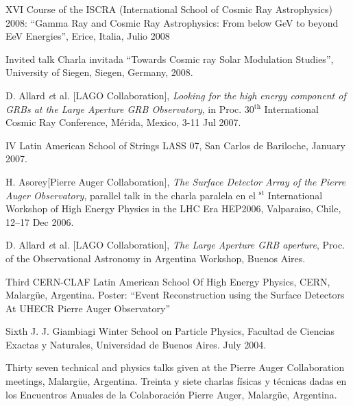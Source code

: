 \begin{etaremune}
\item {}XVI Course of the ISCRA (International School of Cosmic Ray Astrophysics) 2008: ``Gamma Ray and Cosmic Ray Astrophysics: From below GeV to beyond EeV Energies'', Erice, Italia, Julio 2008

\item {}\ifeng Invited talk \else Charla invitada \fi ``Towards Cosmic ray Solar Modulation Studies'', University of Siegen, Siegen, Germany, 2008.

\item {}D. Allard {\emph et al.} [LAGO Collaboration], {\emph{Looking for the high energy component of GRBs at the Large Aperture GRB Observatory}}, in Proc. 30$^{\mathrm{th}}$ International Cosmic Ray Conference,  Mérida, Mexico, 3-11 Jul 2007.

\item {}IV Latin American School of Strings LASS 07, San Carlos de Bariloche, January 2007.

\item {}H. Asorey[Pierre Auger Collaboration], {\emph{The Surface Detector Array of the Pierre Auger Observatory}}, 
\ifeng
parallel talk in the 
\else
charla paralela en el 
$^{\mathrm{st}}$ International Workshop of High Energy Physics in the LHC Era HEP2006, Valparaiso, Chile, 12--17 Dec 2006.

\item {}D. Allard {\emph et al.} [LAGO Collaboration], {\emph{The Large Aperture GRB aperture}}, \en Proc. of the Observational Astronomy in Argentina Workshop, Buenos Aires.

\item {}Third CERN-CLAF Latin American School Of High Energy Physics, CERN, Malargüe, Argentina. Poster: ``Event Reconstruction using the Surface Detectors At UHECR Pierre Auger Observatory''

\item {}Sixth J. J. Giambiagi Winter School on Particle Physics, Facultad de Ciencias Exactas y Naturales, Universidad de Buenos Aires. July 2004.

\item {} 
\ifeng
Thirty seven technical and physics talks given at the Pierre Auger Collaboration meetings, Malargüe, Argentina.
\else
Treinta y siete charlas físicas y técnicas dadas en los Encuentros Anuales de la Colaboración Pierre Auger, Malargüe, Argentina.
\fi
\end{etaremune}
